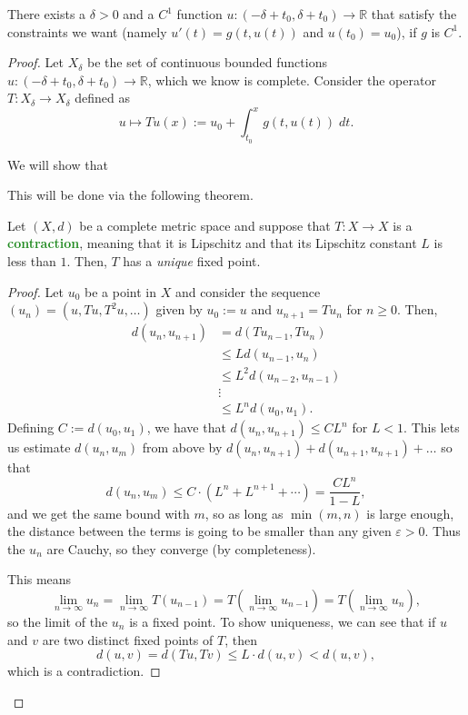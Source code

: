 \documentclass[10pt]{scrartcl}
\providecommand{\eps}{\varepsilon}
\providecommand{\RR}{\mathbb R}
\providecommand{\dif}{\;d}
\providecommand{\vocab}[1]{{\textbf{\textcolor{ForestGreen}{#1}}}}
\begin{document}
\begin{theorem}
	There exists a $\delta > 0$ and a $C^1$ function
	$u\colon(-\delta + t_0, \delta + t_0)\to\RR$ that satisfy
	the constraints we want (namely $u'(t) = g(t, u(t))$ and $u(t_0) = u_0$),
	if $g$ is $C^1$.
\end{theorem}

\begin{proof}
	Let $X_\delta$ be the set of continuous bounded functions
	$u\colon(-\delta + t_0, \delta + t_0)\to\RR$,
	which we know is complete.
	Consider the operator $T\colon X_\delta\to X_\delta$ defined as
	\[u\mapsto Tu(x) := u_0 + \int_{t_0}^x g(t, u(t))\dif t.\]
	
	We will show that
	\begin{center}
	\end{center}
	
	This will be done via the following theorem.
	\begin{theorem*}
		Let $(X, d)$ be a complete metric space and suppose that
		$T\colon X\to X$ is a \vocab{contraction},
		meaning that it is Lipschitz and that its
		Lipschitz constant $L$ is less than $1$.
		Then, $T$ has a \emph{unique} fixed point.
	\end{theorem*}
	
	\begin{proof}
		Let $u_0$ be a point in $X$
		and consider the sequence $(u_n) = (u, Tu, T^2u, \dots)$ given by
		$u_0 := u$ and $u_{n+1} = Tu_n$ for $n\ge 0$. Then,
		\begin{align*}
			d(u_n, u_{n+1}) &= d(Tu_{n-1}, Tu_n)\\
			&\le Ld(u_{n-1}, u_n)\\
			&\le L^2d(u_{n-2}, u_{n-1})\\
			&\vdots\\
			&\le L^nd(u_0, u_1).
		\end{align*}
		Defining $C := d(u_0, u_1)$, we have that
		$d(u_n, u_{n+1}) \le CL^n$ for $L < 1$.
		This lets us estimate $d(u_n, u_m)$ from above by
		$d(u_n, u_{n+1}) + d(u_{n+1}, u_{n+1}) + \dots$ so that
		\[d(u_n, u_m) \le C\cdot (L^n + L^{n+1} + \cdots)
		= \frac{CL^n}{1 - L},\]
		and we get the same bound with $m$, so as long as $\min(m, n)$
		is large enough, the distance between the terms
		is going to be smaller than any given $\eps > 0$.
		Thus the $u_n$ are Cauchy, so they converge (by completeness).
		
		This means
		\[\lim_{n\to\infty} u_n = \lim_{n\to\infty} T(u_{n-1})
		= T(\lim_{n\to\infty} u_{n-1}) = T(\lim_{n\to\infty} u_n),\]
		so the limit of the $u_n$ is a fixed point.
		To show uniqueness, we can see that if $u$ and $v$
		are two distinct fixed points of $T$, then
		\[d(u, v) = d(Tu, Tv) \le L\cdot d(u, v) < d(u, v),\]
		which is a contradiction.
	\end{proof}
	

\end{proof}
\end{document}
